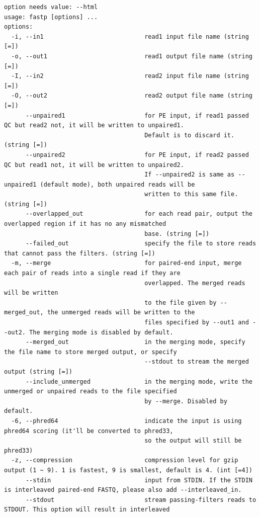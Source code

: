 \documentclass[
  letterpaper,
]{book}
\begin{document}
\begin{verbatim}
option needs value: --html
usage: fastp [options] ...
options:
  -i, --in1                            read1 input file name (string [=])
  -o, --out1                           read1 output file name (string [=])
  -I, --in2                            read2 input file name (string [=])
  -O, --out2                           read2 output file name (string [=])
      --unpaired1                      for PE input, if read1 passed QC but read2 not, it will be written to unpaired1.
                                       Default is to discard it. (string [=])
      --unpaired2                      for PE input, if read2 passed QC but read1 not, it will be written to unpaired2.
                                       If --unpaired2 is same as --unpaired1 (default mode), both unpaired reads will be
                                       written to this same file. (string [=])
      --overlapped_out                 for each read pair, output the overlapped region if it has no any mismatched
                                       base. (string [=])
      --failed_out                     specify the file to store reads that cannot pass the filters. (string [=])
  -m, --merge                          for paired-end input, merge each pair of reads into a single read if they are
                                       overlapped. The merged reads will be written
                                       to the file given by --merged_out, the unmerged reads will be written to the
                                       files specified by --out1 and --out2. The merging mode is disabled by default.
      --merged_out                     in the merging mode, specify the file name to store merged output, or specify
                                       --stdout to stream the merged output (string [=])
      --include_unmerged               in the merging mode, write the unmerged or unpaired reads to the file specified
                                       by --merge. Disabled by default.
  -6, --phred64                        indicate the input is using phred64 scoring (it'll be converted to phred33,
                                       so the output will still be phred33)
  -z, --compression                    compression level for gzip output (1 ~ 9). 1 is fastest, 9 is smallest, default is 4. (int [=4])
      --stdin                          input from STDIN. If the STDIN is interleaved paired-end FASTQ, please also add --interleaved_in.
      --stdout                         stream passing-filters reads to STDOUT. This option will result in interleaved

\end{verbatim}
\end{document}
